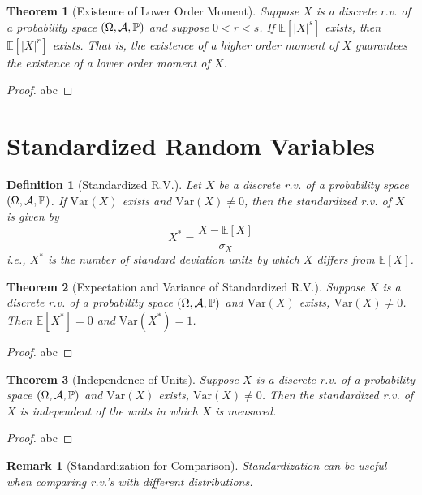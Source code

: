 \documentclass[openany,12pt]{book}
\newtheorem{theorem}{Theorem}[chapter]
\newtheorem{remark}{Remark}[chapter]
\newtheorem{definition}{Definition}[chapter]
\begin{document}
\begin{theorem}[Existence of Lower Order Moment]
Suppose $X$ is a discrete r.v. of a probability space $(\Omega,\mathcal{A},\mathbb{P})$ and suppose $0<r<s$. If $\mathbb{E}[|X|^s]$ exists, then $\mathbb{E}[|X|^r]$ exists. That is, the existence of a higher order moment of $X$ guarantees the existence of a lower order moment of $X$.
\end{theorem}

\begin{proof}
  abc
\end{proof}

\section{Standardized Random Variables}

\begin{definition}[Standardized R.V.]
Let $X$ be a discrete r.v. of a probability space $(\Omega,\mathcal{A},\mathbb{P})$. If $\mathrm{Var}(X)$ exists and $\mathrm{Var}(X)\neq0$, then the standardized r.v. of $X$ is given by 
$$X^*=\frac{X-\mathbb{E}[X]}{\sigma_X}$$
i.e., $X^*$ is the number of standard deviation units by which $X$ differs from $\mathbb{E}[X]$.
\end{definition}

\begin{theorem}[Expectation and Variance of Standardized R.V.]
Suppose $X$ is a discrete r.v. of a probability space $(\Omega,\mathcal{A},\mathbb{P})$ and $\mathrm{Var}(X)$ exists, $\mathrm{Var}(X)\neq0$. Then $\mathbb{E}[X^*]=0$ and $\mathrm{Var}(X^* )=1$.
\end{theorem}

\begin{proof}
  abc
\end{proof}

\begin{theorem}[Independence of Units]
Suppose $X$ is a discrete r.v. of a probability space $(\Omega,\mathcal{A},\mathbb{P})$ and $\mathrm{Var}(X)$ exists, $\mathrm{Var}(X)\neq0$. Then the standardized r.v. of $X$ is independent of the units in which $X$ is measured.
\end{theorem}

\begin{proof}
  abc
\end{proof}

\begin{remark}[Standardization for Comparison]
Standardization can be useful when comparing r.v.'s with different distributions.
\end{remark}
\end{document}
